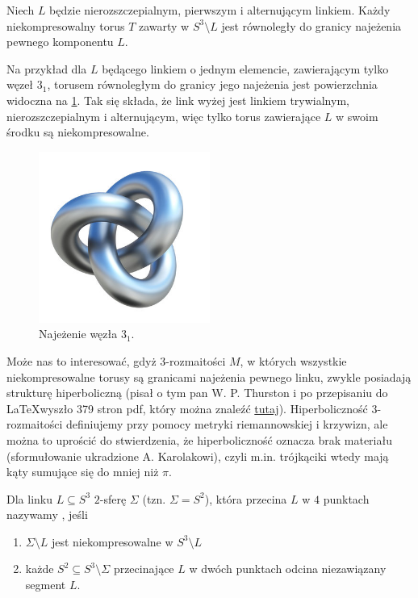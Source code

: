 \documentclass{article}
\begin{document}
\begin{fuck}
  Niech $L$ będzie nierozszczepialnym, pierwszym i alternującym linkiem. Każdy niekompresowalny torus $T$ zawarty w $S^3\setminus L$ jest równoległy do granicy najeżenia pewnego komponentu $L$.
\end{fuck}

Na przykład dla $L$ będącego linkiem o jednym elemencie, zawierającym tylko węzeł $3_1$, torusem równoległym do granicy jego najeżenia jest powierzchnia widoczna na \cref{najezenie trefoil}. Tak się składa, że link wyżej jest linkiem trywialnym, nierozszczepialnym i alternującym, więc tylko torus zawierające $L$ w swoim środku są niekompresowalne.

\begin{figure}[h]\centering
  \includegraphics[width=0.5\textwidth]{trefoil-3d.jpg}
  \caption{\label{najezenie trefoil}Najeżenie węzła $3_1$.}
\end{figure}

Może nas to interesować, gdyż $3$-rozmaitości $M$, w których wszystkie niekompresowalne torusy są granicami najeżenia pewnego linku, zwykle posiadają strukturę hiperboliczną (pisał o tym pan W. P. Thurston i po przepisaniu do \LaTeX wyszło 379 stron pdf, który można znaleźć \href{https://www.math.unl.edu/~jkettinger2/thurston.pdf}{tutaj}). Hiperboliczność $3$-rozmaitości definiujemy przy pomocy metryki riemannowskiej i krzywizn, ale można to uprościć do stwierdzenia, że hiperboliczność oznacza brak materiału (sformułowanie ukradzione A. Karolakowi), czyli m.in. trójkąciki wtedy mają kąty sumujące się do mniej niż $\pi$.

\begin{deff}
  Dla linku $L\subseteq S^3$ $2$-sferę $\Sigma$ (tzn. $\Sigma=S^2$), która przecina $L$ w $4$ punktach nazywamy , jeśli 
  \begin{enumerate}
    \item $\Sigma\setminus L$ jest niekompresowalne w $S^3\setminus L$
    \item każde $S^2\subseteq S^3\setminus \Sigma$ przecinające $L$ w dwóch punktach odcina niezawiązany segment $L$. 
  \end{enumerate}
\end{deff}
\end{document}
